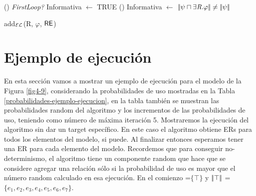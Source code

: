 \begin{algorithm}[H]
\dontprintsemicolon
{}
\Output{\footnotesize $\RE$}
\If()
{\em FirstLoop?}{
Informativa $\leftarrow$ TRUE }
\lElse() {Informativa $\leftarrow$ $|\!|\psi \sqcap \exists \mbox{\em R}.\varphi|\!| \neq |\!|\psi|\!|$}
\caption{add$_\mathcal{EL}$(R, $\varphi$, $\RE$)} \label{algo:bisim-add-el-over}
\end{algorithm}


\section{Ejemplo de ejecuci\'on}
\label{sec:ejemplo_ejecucion}

En esta secci\'on vamos a mostrar un ejemplo de ejecuci\'on para el modelo de la Figura \ref{fig4-9}, considerando la probabilidades de uso mostradas en la Tabla \ref{probabilidades-ejemplo-ejecucion}, en la tabla tambi\'en se muestran las probabilidades random del algoritmo y los incrementos de las probabilidades de uso, teniendo como n\'umero de m\'axima iteraci\'on 5. Mostraremos la ejecuci\'on del algoritmo sin dar un target espec\'ifico. En este caso el algoritmo obtiene ERs para todos los elementos del modelo, si puede. Al finalizar entonces esperamos tener una ER para cada elemento del modelo. Recordemos que para conseguir no-determinismo, el algoritmo tiene un componente random que hace que se considere agregar una relaci\'on s\'olo si la probabilidad de uso es mayor que el n\'umero random calculado en esa ejecuci\'on. 
En el comienzo \RE=$\{\top\}$ y $|\!|\top|\!|$ = $\{e_1, e_2, e_3, e_4, e_5, e_6, e_7\}$.\\

